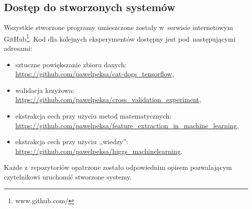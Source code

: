 \renewcommand{\appendixtocname}{Dodatki}
\renewcommand{\appendixpagename}{Dodatki}

\clearpage

\begin{appendices}
\section{Dostęp do stworzonych systemów}
Wszystkie stworzone programy umieszczone zostały w~serwisie internetowym GitHub\footnote{www.github.com/}. Kod dla kolejnych eksperymentów dostępny jest pod~następującymi adresami:
\begin{itemize}
\item sztuczne powiększanie zbioru danych: \\ \url{https://github.com/pawelpeksa/cat-dogs_tensorflow},
\item walidacja krzyżowa: \\ \url{https://github.com/pawelpeksa/cross_validation_experiment},
\item ekstrakcja cech przy użyciu metod matematycznych: \\ \url{https://github.com/pawelpeksa/feature_extraction_in_machine_learning},
\item ekstrakcja cech przy użyciu ,,wiedzy'': \\ \url{https://github.com/pawelpeksa/higgs_machinelearning}.
\end{itemize}
Każde z~repozytoriów opatrzone zostało odpowiednim opisem pozwalającym czytelnikowi uruchomić stworzone systemy.
\end{appendices}
